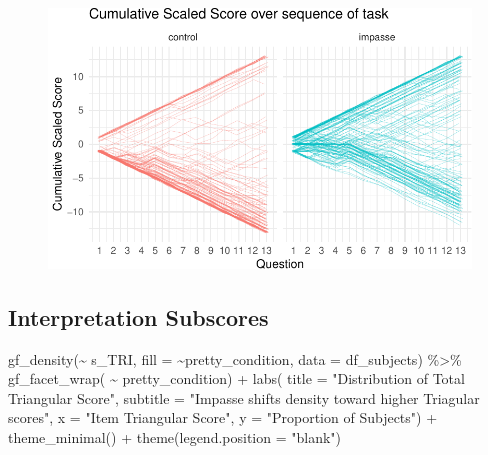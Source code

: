 \documentclass[
  letterpaper,
  DIV=11,
  numbers=noendperiod]{scrreprt}
\newenvironment{Shaded}{\begin{snugshade}}{\end{snugshade}}
\newcommand{\AttributeTok}[1]{\textcolor[rgb]{0.40,0.45,0.13}{#1}}
\newcommand{\FunctionTok}[1]{\textcolor[rgb]{0.28,0.35,0.67}{#1}}
\newcommand{\NormalTok}[1]{\textcolor[rgb]{0.00,0.23,0.31}{#1}}
\newcommand{\SpecialCharTok}[1]{\textcolor[rgb]{0.37,0.37,0.37}{#1}}
\newcommand{\StringTok}[1]{\textcolor[rgb]{0.13,0.47,0.30}{#1}}
\begin{document}
\begin{figure}[H]

{\centering \includegraphics{analysis/SGC3A/2_sgc3A_scoring_files/figure-pdf/VIZ-PROGRESS-2.pdf}

}

\end{figure}

\hypertarget{interpretation-subscores}{%
\subsection{Interpretation Subscores}\label{interpretation-subscores}}

\begin{Shaded}
\begin{Highlighting}[]
\FunctionTok{gf\_density}\NormalTok{(}\SpecialCharTok{\textasciitilde{}}\NormalTok{ s\_TRI, }\AttributeTok{fill =} \SpecialCharTok{\textasciitilde{}}\NormalTok{pretty\_condition, }\AttributeTok{data =}\NormalTok{ df\_subjects) }\SpecialCharTok{\%\textgreater{}\%} 
  \FunctionTok{gf\_facet\_wrap}\NormalTok{( }\SpecialCharTok{\textasciitilde{}}\NormalTok{ pretty\_condition) }\SpecialCharTok{+} 
  \FunctionTok{labs}\NormalTok{( }\AttributeTok{title =} \StringTok{"Distribution of Total Triangular Score"}\NormalTok{,}
        \AttributeTok{subtitle =} \StringTok{"Impasse shifts density toward higher Triagular scores"}\NormalTok{,}
        \AttributeTok{x =} \StringTok{"Item Triangular Score"}\NormalTok{, }\AttributeTok{y =} \StringTok{"Proportion of Subjects"}\NormalTok{) }\SpecialCharTok{+} 
        \FunctionTok{theme\_minimal}\NormalTok{() }\SpecialCharTok{+} \FunctionTok{theme}\NormalTok{(}\AttributeTok{legend.position =} \StringTok{"blank"}\NormalTok{)}
\end{Highlighting}
\end{Shaded}
\end{document}
